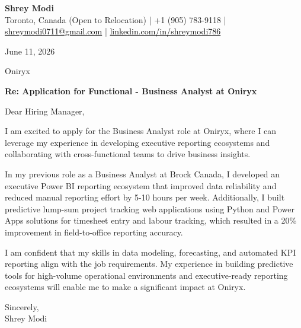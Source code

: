 \documentclass[11pt,letterpaper]{article}
\begin{document}
\begin{center}
  {\Large \bfseries \color{accent} Shrey Modi}\\[0.2em]
  {\small
    Toronto, Canada (Open to Relocation)
 | +1 (905) 783-9118 | \href{mailto:shreymodi0711@gmail.com}{\textcolor{black}{shreymodi0711@gmail.com}} | \href{https://linkedin.com/in/shreymodi786}{\textcolor{black}{linkedin.com/in/shreymodi786}}  }
\end{center}

\vspace{1em}

June 11, 2026

\vspace{0.5em}

Oniryx\\

\vspace{0.5em}

\textbf{Re: Application for Functional - Business Analyst at Oniryx}

Dear Hiring Manager,

I am excited to apply for the Business Analyst role at Oniryx, where I can leverage my experience in developing executive reporting ecosystems and collaborating with cross-functional teams to drive business insights.

In my previous role as a Business Analyst at Brock Canada, I developed an executive Power BI reporting ecosystem that improved data reliability and reduced manual reporting effort by 5-10 hours per week. Additionally, I built predictive lump-sum project tracking web applications using Python and Power Apps solutions for timesheet entry and labour tracking, which resulted in a 20\% improvement in field-to-office reporting accuracy.

I am confident that my skills in data modeling, forecasting, and automated KPI reporting align with the job requirements. My experience in building predictive tools for high-volume operational environments and executive-ready reporting ecosystems will enable me to make a significant impact at Oniryx.

Sincerely,\\
Shrey Modi
\end{document}
